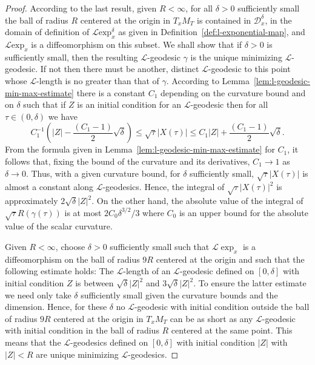 \begin{proof}
\sketch
According to the last result, given $R<\infty$, for all $\delta>0$ sufficiently
small the ball of radius $R$ centered at the origin in $T_xM_T$ is contained in
${\mathcal D}_x^\delta$, in the domain of definition of ${\mathcal L}\mathrm{exp}_x^\delta$ as given in Definition~\ref{def:l-exponential-map}, and ${\mathcal L}\mathrm{exp}_x$ is a diffeomorphism on this subset. We shall show that if $\delta>0$ is
sufficiently small, then the resulting ${\mathcal L}$-geodesic $\gamma$ is the
unique minimizing ${\mathcal L}$-geodesic. If not then there must be another,
distinct ${\mathcal L}$-geodesic to this point whose ${\mathcal L}$-length is
no greater than that of $\gamma$. According to Lemma~\ref{lem:l-geodesic-min-max-estimate} there is a
constant $C_1$ depending on the curvature bound and on $\delta$ such that if
$Z$ is an initial condition for an ${\mathcal L}$-geodesic then for all
$\tau\in (0,\delta)$ we have
$$C_1^{-1}\left(|Z|-\frac{(C_1-1)}{2}\sqrt{\delta}\right)\le \sqrt{\tau}|X(\tau)|\le
C_1|Z|+\frac{(C_1-1)}{2}\sqrt{\delta}.$$ From the formula given in
Lemma~\ref{lem:l-geodesic-min-max-estimate} for $C_1$, it follows that, fixing the bound of
the curvature and its derivatives,
 $C_1\rightarrow 1$ as $\delta\rightarrow 0$. Thus, with
a given curvature bound, for $\delta$ sufficiently small,
$\sqrt{\tau}|X(\tau)|$ is almost a constant along ${\mathcal
L}$-geodesics. Hence, the integral of $\sqrt{\tau}|X(\tau)|^2$ is
approximately $2\sqrt{\delta}|Z|^2$. On the other hand, the absolute
value of the integral of $\sqrt{\tau}R(\gamma(\tau))$ is at most
$2C_0\delta^{3/2}/3$ where $C_0$ is an upper bound for the absolute
value of the scalar curvature.

Given $R<\infty$, choose  $\delta>0$ sufficiently small such that ${\mathcal
L}\exp_x$ is a diffeomorphism on the ball of radius $9R$ centered at the
origin and such that the following estimate holds: The ${\mathcal L}$-length of
an ${\mathcal L}$-geodesic defined on $[0,\delta]$ with initial condition $Z$
is between $\sqrt{\delta}|Z|^2$ and $3\sqrt{\delta}|Z|^2$. To ensure the latter
estimate we need only take $\delta$ sufficiently small given the curvature
bounds and the dimension. Hence, for these $\delta$ no ${\mathcal L}$-geodesic
with initial condition outside the ball of radius $9R$ centered at the origin
in $T_xM_T$ can be as short as any ${\mathcal L}$-geodesic with initial
condition in the ball of radius $R$ centered at the same point. This means that
the ${\mathcal L}$-geodesics defined on $[0,\delta]$ with initial condition
$|Z|$ with $|Z|<R$ are unique minimizing ${\mathcal L}$-geodesics.
\end{proof}

